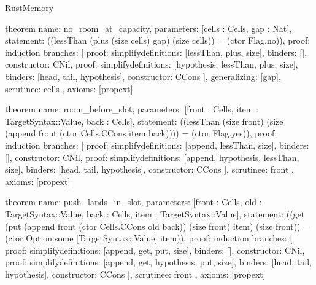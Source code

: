 \begin{lexlean}{RustMemory}
\begin{semanticmodule}
theorem{
  name: no_room_at_capacity,
  parameters: [cells : Cells, gap : Nat],
  statement: ((lessThan (plus (size cells) gap) (size cells)) = (ctor Flag.no)),
  proof: induction{
    branches: [
      {proof: simplify{definitions: [lessThan, plus, size]}, binders: [], constructor: CNil},
      {
        proof: simplify{definitions: [hypothesis, lessThan, plus, size]},
        binders: [head, tail, hypothesis],
        constructor: CCons
      }
    ],
    generalizing: [gap],
    scrutinee: cells
  },
  axioms: [propext]
}

theorem{
  name: room_before_slot,
  parameters: [front : Cells, item : TargetSyntax::Value, back : Cells],
  statement: ((lessThan (size front) (size (append front (ctor Cells.CCons item back)))) = (ctor Flag.yes)),
  proof: induction{
    branches: [
      {proof: simplify{definitions: [append, lessThan, size]}, binders: [], constructor: CNil},
      {
        proof: simplify{definitions: [append, hypothesis, lessThan, size]},
        binders: [head, tail, hypothesis],
        constructor: CCons
      }
    ],
    scrutinee: front
  },
  axioms: [propext]
}

theorem{
  name: push_lands_in_slot,
  parameters: [front : Cells, old : TargetSyntax::Value, back : Cells, item : TargetSyntax::Value],
  statement: ((get (put (append front (ctor Cells.CCons old back)) (size front) item) (size front)) = (ctor Option.some [TargetSyntax::Value] item)),
  proof: induction{
    branches: [
      {proof: simplify{definitions: [append, get, put, size]}, binders: [], constructor: CNil},
      {
        proof: simplify{definitions: [append, get, hypothesis, put, size]},
        binders: [head, tail, hypothesis],
        constructor: CCons
      }
    ],
    scrutinee: front
  },
  axioms: [propext]
}


\end{semanticmodule}
\end{lexlean}
